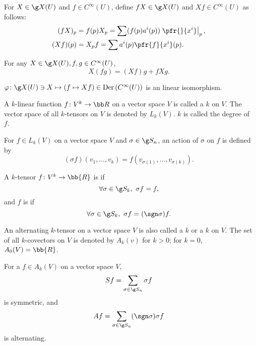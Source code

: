 For $X \in \g X(U)$ and $f \in C^\infty(U)$, define $fX \in \g X(U)$ and $Xf \in C^\infty(U)$ as follows:
\begin{align*}
(fX)_p &= f(p)X_p = \sum (f(p)a^i(p)) \left. \pfr{}{x^i}\right|_p,\\
(Xf)(p) &= X_p f = \sum a^i (p) \pfr{f}{x^i} (p).
\end{align*}

For any $X \in \g X(U), f, g \in C^\infty(U)$,
\[
X(fg) = (Xf)g + fXg.
\]

$\varphi \colon \g X(U) \ni X \mapsto (f \mapsto Xf) \in \mathrm{Der}\, (C^\infty(U))$ is an linear isomorphism.

A $k$-linear function $f \colon V^k \to \bb R$ on a vector space $V$ is called a $k$ on $V$. The vector space of all $k$-tensors on $V$ is denoted by $L_k(V)$. $k$ is called the degree of $f$.

For $f \in L_k(V)$ on a vector space $V$ and $\sigma \in \g S_n$, an action of $\sigma $ on $f$ is defined by
\[
(\sigma f)(v_1, \dotsc, v_k) = f(v_{\sigma(1)},\dotsc, v_{\sigma(k)}).
\]

A $k$-tensor $f \colon V^k \to \bb{R}$ is  if
\[
\forall \sigma \in \g S_k,\ \sigma f  =f,
\]
and $f$ is  if
\[
\forall \sigma \in \g S_k,\ \sigma f = (\sgn \sigma) f.
\]

An alternating $k$-tensor on a vector space $V$ is also called a $k$ or a  $k$ on $V$. The set of all $k$-covectors on $V$ is denoted by $A_k(v)$ for $k > 0$; for $k = 0$, $A_0 (V) = \bb{R}$.

For a $f \in A_k(V)$ on a vector space $V$,
\[
 Sf = \sum_{\sigma \in \g S_n} \sigma f
\]
is symmetric, and
\[
 Af = \sum_{\sigma \in \g S_n} (\sgn \sigma) \sigma f
\]
is alternating.


